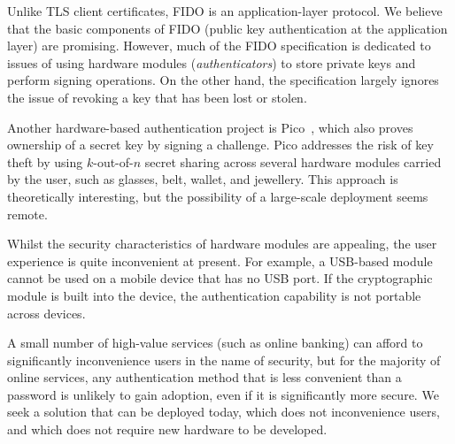 Unlike TLS client certificates, FIDO is an application-layer protocol. We believe that the basic
components of FIDO (public key authentication at the application layer) are promising. However, much
of the FIDO specification is dedicated to issues of using hardware modules (\emph{authenticators})
to store private keys and perform signing operations. On the other hand, the specification largely
ignores the issue of revoking a key that has been lost or stolen.

Another hardware-based authentication project is Pico~\cite{Stajano11}, which also proves ownership
of a secret key by signing a challenge. Pico addresses the risk of key theft by using $k$-out-of-$n$
secret sharing across several hardware modules carried by the user, such as glasses, belt, wallet,
and jewellery. This approach is theoretically interesting, but the possibility of a large-scale
deployment seems remote.

Whilst the security characteristics of hardware modules are appealing, the user experience is quite
inconvenient at present. For example, a USB-based module cannot be used on a mobile device that has
no USB port. If the cryptographic module is built into the device, the authentication capability is
not portable across devices.

A small number of high-value services (such as online banking) can afford to significantly
inconvenience users in the name of security, but for the majority of online services, any
authentication method that is less convenient than a password is unlikely to gain adoption, even if
it is significantly more secure. We seek a solution that can be deployed today, which does not
inconvenience users, and which does not require new hardware to be developed.
